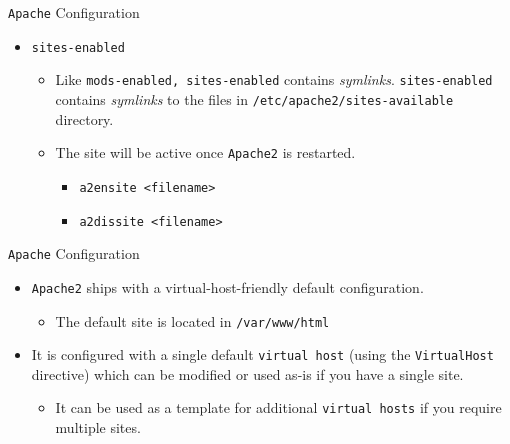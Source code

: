 \documentclass[xcolor=table,aspectratio=169]{beamer}
\begin{document}
\begin{frame}{\texttt{Apache} Configuration}
  \begin{itemize}
    \item \texttt{sites-enabled} 
      \begin{itemize}
        \item Like \texttt{mods-enabled, sites-enabled} contains \textit{symlinks}.  \texttt{sites-enabled} contains \textit{symlinks} to the files in \texttt{/etc/apache2/sites-available} directory. 
        \item The site will be active once \texttt{Apache2} is restarted.
          \begin{itemize}
            \item \texttt{a2ensite \textless filename\textgreater}
            \item \texttt{a2dissite \textless filename\textgreater}
          \end{itemize}
      \end{itemize}
  \end{itemize}
\end{frame}

\begin{frame}{\texttt{Apache} Configuration}
  \begin{itemize}
    \item \texttt{Apache2} ships with a virtual-host-friendly default configuration. 
      \begin{itemize}
        \item The default site is located in \texttt{/var/www/html}
      \end{itemize}
    \item It is configured with a single default \texttt{virtual host} (using the \texttt{VirtualHost} directive) which can be modified or used as-is if you have a single site.
      \begin{itemize}
        \item It can be used as a template for additional \texttt{virtual hosts} if you require multiple sites. 
      \end{itemize}
  \end{itemize}
\end{frame}
\end{document}
